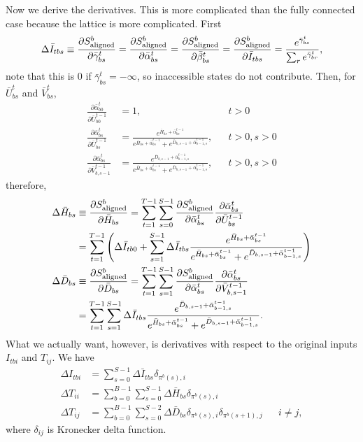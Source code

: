 \documentclass[a4paper]{article}
\begin{document}
Now we derive the derivatives. This is more complicated than the fully connected case because the lattice is more complicated. First
\begin{equation}
\Delta \bar{I}_{tbs} \equiv \frac{\partial S^b_{\rm{aligned}}}{\partial\bar\gamma^t_{bs}}=\frac{\partial S^b_{\rm{aligned}}}{\partial\bar\alpha^t_{bs}}=\frac{\partial S^b_{\rm{aligned}}}{\partial\bar\beta^t_{bs}}=\frac{\partial S^b_{\rm{aligned}}}{\partial \bar I_{tbs}}=\frac{e^{\bar\gamma^t_{bs}}}{\sum_r e^{\bar\gamma^t_{br}}},
\end{equation}
note that this is $0$ if $\bar\gamma^t_{bs}=-\infty$, so inaccessible states do not contribute. Then, for $\bar U^{t}_{bs}$ and $\bar V^{t}_{bs}$,
\begin{align}
\frac{\partial \bar\alpha^t_{b0}}{\partial \bar{U}^{t-1}_{b0}} &= 1, 
&& t>0 \\
\frac{\partial \bar\alpha^t_{bs}}{\partial \bar{U}^{t-1}_{bs}}
&=\frac{e^{\bar{H}_{bs}+\bar\alpha^{t-1}_{bs}}}{e^{\bar{H}_{bs}+\bar\alpha^{t-1}_{bs}} + e^{\bar{D}_{b,s-1}+\bar\alpha^{t-1}_{b-1,s}}},
&& t>0, s>0\\
\frac{\partial \bar\alpha^t_{bs}}{\partial \bar{V}^{t-1}_{b,s-1}}
&=\frac{e^{\bar{D}_{b,s-1}+\bar\alpha^{t-1}_{b-1,s}}}{e^{\bar{H}_{bs}+\bar\alpha^{t-1}_{bs}} + e^{\bar{D}_{b,s-1}+\bar\alpha^{t-1}_{b-1,s}}},
&& t>0, s>0
\end{align}
therefore,
\begin{align}
\Delta\bar{H}_{bs}&\equiv\frac{\partial S^b_{\rm{aligned}}}{\partial\bar{H}_{bs}}
=\sum_{t=1}^{T-1}\sum_{s=0}^{S-1}\frac{\partial S^b_{\rm{aligned}}}{\partial\bar\alpha^t_{bs}}\frac{\partial\bar\alpha^t_{bs}}{\partial\bar U^{t-1}_{bs}}\\
&=\sum_{t=1}^{T-1}\left(\Delta\bar I_{tb0}+\sum_{s=1}^{S-1}\Delta\bar I_{tbs}\frac{e^{\bar{H}_{bs}+\bar\alpha^{t-1}_{bs}}}{e^{\bar{H}_{bs}+\bar\alpha^{t-1}_{bs}} + e^{\bar{D}_{b,s-1}+\bar\alpha^{t-1}_{b-1,s}}}\right)\\
\Delta\bar{D}_{bs}&\equiv\frac{\partial S^b_{\rm{aligned}}}{\partial\bar{D}_{bs}}
=\sum_{t=1}^{T-1}\sum_{s=1}^{S-1}\frac{\partial S^b_{\rm{aligned}}}{\partial\bar\alpha^t_{bs}}\frac{\partial\bar\alpha^t_{bs}}{\partial\bar V^{t-1}_{b,s-1}}\\
&=\sum_{t=1}^{T-1}\sum_{s=1}^{S-1}\Delta\bar I_{tbs}\frac{e^{\bar{D}_{b,s-1}+\bar\alpha^{t-1}_{b-1,s}}}{e^{\bar{H}_{bs}+\bar\alpha^{t-1}_{bs}} + e^{\bar{D}_{b,s-1}+\bar\alpha^{t-1}_{b-1,s}}}.
\end{align}
What we actually want, however, is derivatives with respect to the original inputs $I_{tbi}$ and $T_{ij}$. We have
\begin{align}
\Delta I_{tbi}&=\sum_{s=0}^{S-1}\Delta\bar I_{tbs}\delta_{\pi^b(s),i}\\
\Delta T_{ii}&=\sum_{b=0}^{B-1}\sum_{s=0}^{S-1}\Delta\bar H_{bs} \delta_{\pi^b(s),i}\\
\Delta T_{ij}&=\sum_{b=0}^{B-1}\sum_{s=0}^{S-2}\Delta\bar D_{bs} \delta_{\pi^b(s),i}\delta_{\pi^b(s+1),j} && i\neq j,
\end{align}
where $\delta_{ij}$ is Kronecker delta function.
\end{document}
